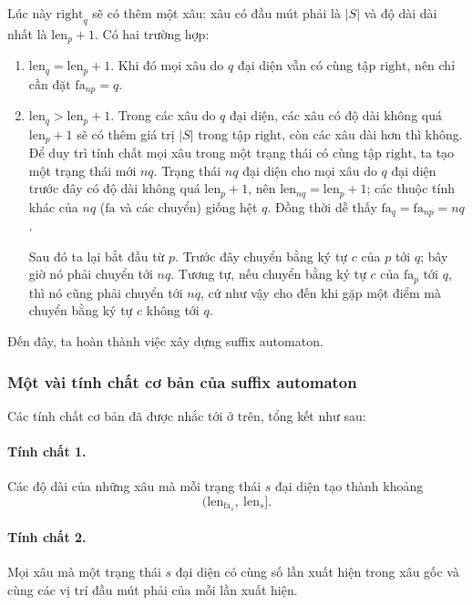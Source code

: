 \documentclass[11pt]{article}
\begin{document}
Lúc này \(\mathrm{right}_q\) sẽ có thêm một xâu: xâu có đầu mút phải là \(|S|\)
và độ dài dài nhất là \(\mathrm{len}_p+1\). Có hai trường hợp:
\begin{enumerate}
  \item \(\mathrm{len}_q=\mathrm{len}_p+1\). Khi đó mọi xâu do \(q\) đại diện
  vẫn có cùng tập \(\mathrm{right}\), nên chỉ cần đặt
  \(\mathrm{fa}_{np}=q\).
  \item \(\mathrm{len}_q>\mathrm{len}_p+1\). Trong các xâu do \(q\) đại diện,
  các xâu có độ dài không quá \(\mathrm{len}_p+1\) sẽ có thêm giá trị
  \(|S|\) trong tập \(\mathrm{right}\), còn các xâu dài hơn thì không. Để duy
  trì tính chất mọi xâu trong một trạng thái có cùng tập \(\mathrm{right}\),
  ta tạo một trạng thái mới \(nq\). Trạng thái \(nq\) đại diện cho mọi xâu do
  \(q\) đại diện trước đây có độ dài không quá \(\mathrm{len}_p+1\), nên
  \(\mathrm{len}_{nq}=\mathrm{len}_p+1\); các thuộc tính khác của \(nq\)
  (\(\mathrm{fa}\) và các chuyển) giống hệt \(q\). Đồng thời dễ thấy
  \(\mathrm{fa}_q=\mathrm{fa}_{np}=nq\).

  Sau đó ta lại bắt đầu từ \(p\). Trước đây chuyển bằng ký tự \(c\) của \(p\)
  tới \(q\); bây giờ nó phải chuyển tới \(nq\). Tương tự, nếu chuyển bằng ký tự
  \(c\) của \(\mathrm{fa}_p\) tới \(q\), thì nó cũng phải chuyển tới \(nq\),
  cứ như vậy cho đến khi gặp một điểm mà chuyển bằng ký tự \(c\) không tới
  \(q\).
\end{enumerate}

Đến đây, ta hoàn thành việc xây dựng suffix automaton.

\subsubsection{Một vài tính chất cơ bản của suffix automaton}

Các tính chất cơ bản đã được nhắc tới ở trên, tổng kết như sau:

\paragraph{Tính chất 1.}
Các độ dài của những xâu mà mỗi trạng thái \(s\) đại diện tạo thành khoảng
\[
  (\mathrm{len}_{\mathrm{fa}_s},\ \mathrm{len}_s].
\]

\paragraph{Tính chất 2.}
Mọi xâu mà một trạng thái \(s\) đại diện có cùng số lần xuất hiện trong xâu gốc
và cùng các vị trí đầu mút phải của mỗi lần xuất hiện.
\end{document}
